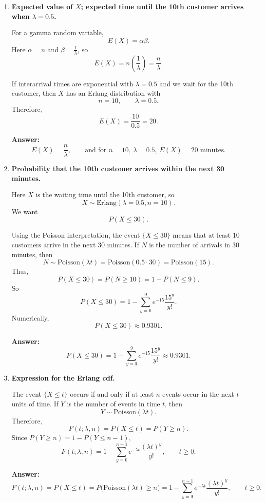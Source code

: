\begin{enumerate}
    \item[(a)] \textbf{Expected value of $X$; expected time until the 10th customer arrives when $\lambda=0.5$.}

    For a gamma random variable,
    \[
    E(X)=\alpha\beta.
    \]
    Here $\alpha=n$ and $\beta=\frac{1}{\lambda}$, so
    \[
    E(X)=n\left(\frac{1}{\lambda}\right)=\frac{n}{\lambda}.
    \]

    If interarrival times are exponential with $\lambda=0.5$ and we wait for the 10th customer, then $X$ has an Erlang distribution with
    \[
    n=10,\qquad \lambda=0.5.
    \]
    Therefore,
    \[
    E(X)=\frac{10}{0.5}=20.
    \]

    \textbf{Answer:} 
    \[
    E(X)=\frac{n}{\lambda},\qquad \text{and for } n=10,\ \lambda=0.5,\ E(X)=20\text{ minutes.}
    \]

    \item[(b)] \textbf{Probability that the 10th customer arrives within the next 30 minutes.}

    Here $X$ is the waiting time until the 10th customer, so
    \[
    X\sim \text{Erlang}(\lambda=0.5,n=10).
    \]
    We want
    \[
    P(X\le 30).
    \]

    Using the Poisson interpretation, the event $\{X\le 30\}$ means that at least 10 customers arrive in the next 30 minutes. If $N$ is the number of arrivals in 30 minutes, then
    \[
    N\sim \text{Poisson}(\lambda t)=\text{Poisson}(0.5\cdot 30)=\text{Poisson}(15).
    \]
    Thus,
    \[
    P(X\le 30)=P(N\ge 10)=1-P(N\le 9).
    \]
    So
    \[
    P(X\le 30)=1-\sum_{y=0}^{9} e^{-15}\frac{15^y}{y!}.
    \]
    Numerically,
    \[
    P(X\le 30)\approx 0.9301.
    \]

    \textbf{Answer:}
    \[
    P(X\le 30)=1-\sum_{y=0}^{9} e^{-15}\frac{15^y}{y!}\approx 0.9301.
    \]

    \item[(c)] \textbf{Expression for the Erlang cdf.}

    The event $\{X\le t\}$ occurs if and only if at least $n$ events occur in the next $t$ units of time. If $Y$ is the number of events in time $t$, then
    \[
    Y\sim \text{Poisson}(\lambda t).
    \]
    Therefore,
    \[
    F(t;\lambda,n)=P(X\le t)=P(Y\ge n).
    \]
    Since $P(Y\ge n)=1-P(Y\le n-1)$,
    \[
    F(t;\lambda,n)=1-\sum_{y=0}^{n-1} e^{-\lambda t}\frac{(\lambda t)^y}{y!}, \qquad t\ge 0.
    \]

    \textbf{Answer:}
    \[
    F(t;\lambda,n)=P(X\le t)=P\bigl(\text{Poisson}(\lambda t)\ge n\bigr)
    =1-\sum_{y=0}^{n-1} e^{-\lambda t}\frac{(\lambda t)^y}{y!}, \qquad t\ge 0.
    \]
\end{enumerate}

